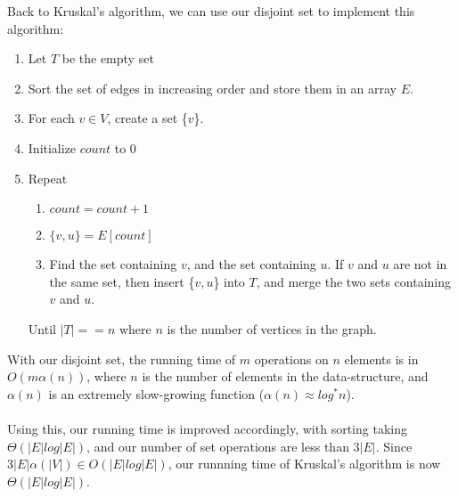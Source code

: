 \documentclass[a4paper]{article}
\begin{document}
Back to Kruskal's algorithm, we can use our disjoint set to implement this algorithm:
\begin{enumerate} \itemsep0em
	\item Let $T$ be the empty set
	\item Sort the set of edges in increasing order and store them in an array $E$.
	\item For each $v\in V$, create a set \{$v$\}.
	\item Initialize $count$ to 0
	\item Repeat
	\begin{enumerate}
		\item $count = count + 1$
		\item $\{v,u\} = E[count]$
		\item Find the set containing $v$, and the set containing $u$. If $v$ and $u$ are not in the same set, then insert \{$v,u$\} into $T$, and merge the two sets containing $v$ and $u$.
	\end{enumerate}
	Until $|T| == n$ where $n$ is the number of vertices in the graph.
\end{enumerate}
With our disjoint set, the running time of $m$ operations on $n$ elements is in $O(m\alpha(n))$, where $n$ is the number of elements in the data-structure, and $\alpha(n)$ is an extremely slow-growing function ($\alpha(n) \approx log^*n$).\\\\
Using this, our running time is improved accordingly, with sorting taking $\Theta(|E|log|E|)$, and our number of set operations are less than $3|E|$. Since $3|E|\alpha(|V|) \in O(|E|log|E|)$, our runnning time of Kruskal's algorithm is now $\Theta(|E|log|E|)$.
\end{document}
